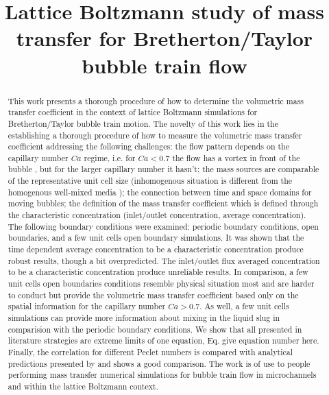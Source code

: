 \documentclass{article}
\title{Lattice Boltzmann study of mass transfer for Bretherton/Taylor bubble train flow}
\begin{document}
\maketitle
\begin{abstract}
This work presents a thorough procedure of how to determine the volumetric mass transfer
coefficient
in the context of lattice Boltzmann simulations for Bretherton/Taylor bubble train motion. The
novelty of this work lies in the establishing
a thorough procedure of how to measure the volumetric mass transfer coefficient addressing the
following challenges: the flow pattern  depends on the capillary number $Ca$ regime, i.e. for
$Ca<0.7$ the flow has a vortex in front of the
bubble \cite{giavedoni-numerical}, but for the larger capillary number it hasn't;  the mass sources are comparable of the
representative unit cell size (inhomogenous situation is different from the homogenous well-mixed
media \cite{jos-mass}); the connection between time and space domains for moving bubbles; the
definition of the mass transfer coefficient which is defined through the characteristic
concentration (inlet/outlet concentration, average concentration). The following boundary conditions
were examined: periodic boundary conditions, open boundaries, and a few unit cells open boundary
simulations. It was shown that the time dependent average concentration to be a characteristic
concentration produce robust results, though a bit overpredicted. The inlet/outlet flux averaged
concentration to be a characteristic concentration produce unreliable results. In comparison, a few
unit cells open boundaries conditions resemble physical situation most and are harder to conduct
but provide the volumetric mass transfer coefficient based only on the spatial information for the
capillary number $Ca>0.7$. As well, a few unit cells simulations can provide more information about
mixing in the liquid slug in comparision with the periodic boundary conditions. We show
that all presented in literature strategies are extreme limits of one equation,
Eq. {\color{red} give equation number here}. Finally, the correlation for different Peclet numbers
is compared with analytical predictions presented by \citet{vanbaten-circular} and shows a good
comparison. The work is of use to people performing mass transfer numerical simulations for bubble
train flow in microchannels and within the
lattice Boltzmann context.
\end{abstract}
\end{document}
